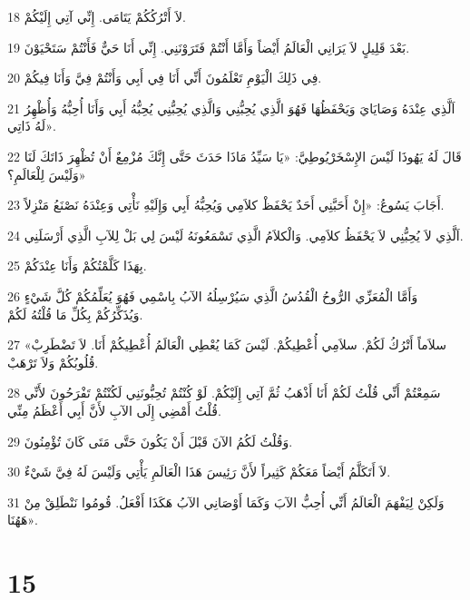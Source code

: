 \par 18 لاَ أَتْرُكُكُمْ يَتَامَى. إِنِّي آتِي إِلَيْكُمْ.
\par 19 بَعْدَ قَلِيلٍ لاَ يَرَانِي الْعَالَمُ أَيْضاً وَأَمَّا أَنْتُمْ فَتَرَوْنَنِي. إِنِّي أَنَا حَيٌّ فَأَنْتُمْ سَتَحْيَوْنَ.
\par 20 فِي ذَلِكَ الْيَوْمِ تَعْلَمُونَ أَنِّي أَنَا فِي أَبِي وَأَنْتُمْ فِيَّ وَأَنَا فِيكُمْ.
\par 21 اَلَّذِي عِنْدَهُ وَصَايَايَ وَيَحْفَظُهَا فَهُوَ الَّذِي يُحِبُّنِي وَالَّذِي يُحِبُّنِي يُحِبُّهُ أَبِي وَأَنَا أُحِبُّهُ وَأُظْهِرُ لَهُ ذَاتِي».
\par 22 قَالَ لَهُ يَهُوذَا لَيْسَ الإِسْخَرْيُوطِيَّ: «يَا سَيِّدُ مَاذَا حَدَثَ حَتَّى إِنَّكَ مُزْمِعٌ أَنْ تُظْهِرَ ذَاتَكَ لَنَا وَلَيْسَ لِلْعَالَمِ؟»
\par 23 أَجَابَ يَسُوعُ: «إِنْ أَحَبَّنِي أَحَدٌ يَحْفَظْ كلاَمِي وَيُحِبُّهُ أَبِي وَإِلَيْهِ نَأْتِي وَعِنْدَهُ نَصْنَعُ مَنْزِلاً.
\par 24 اَلَّذِي لاَ يُحِبُّنِي لاَ يَحْفَظُ كلاَمِي. وَالْكلاَمُ الَّذِي تَسْمَعُونَهُ لَيْسَ لِي بَلْ لِلآبِ الَّذِي أَرْسَلَنِي.
\par 25 بِهَذَا كَلَّمْتُكُمْ وَأَنَا عِنْدَكُمْ.
\par 26 وَأَمَّا الْمُعَزِّي الرُّوحُ الْقُدُسُ الَّذِي سَيُرْسِلُهُ الآبُ بِاسْمِي فَهُوَ يُعَلِّمُكُمْ كُلَّ شَيْءٍ وَيُذَكِّرُكُمْ بِكُلِّ مَا قُلْتُهُ لَكُمْ.
\par 27 «سلاَماً أَتْرُكُ لَكُمْ. سلاَمِي أُعْطِيكُمْ. لَيْسَ كَمَا يُعْطِي الْعَالَمُ أُعْطِيكُمْ أَنَا. لاَ تَضْطَرِبْ قُلُوبُكُمْ وَلاَ تَرْهَبْ.
\par 28 سَمِعْتُمْ أَنِّي قُلْتُ لَكُمْ أَنَا أَذْهَبُ ثُمَّ آتِي إِلَيْكُمْ. لَوْ كُنْتُمْ تُحِبُّونَنِي لَكُنْتُمْ تَفْرَحُونَ لأَنِّي قُلْتُ أَمْضِي إِلَى الآبِ لأَنَّ أَبِي أَعْظَمُ مِنِّي.
\par 29 وَقُلْتُ لَكُمُ الآنَ قَبْلَ أَنْ يَكُونَ حَتَّى مَتَى كَانَ تُؤْمِنُونَ.
\par 30 لاَ أَتَكَلَّمُ أَيْضاً مَعَكُمْ كَثِيراً لأَنَّ رَئِيسَ هَذَا الْعَالَمِ يَأْتِي وَلَيْسَ لَهُ فِيَّ شَيْءٌ.
\par 31 وَلَكِنْ لِيَفْهَمَ الْعَالَمُ أَنِّي أُحِبُّ الآبَ وَكَمَا أَوْصَانِي الآبُ هَكَذَا أَفْعَلُ. قُومُوا نَنْطَلِقْ مِنْ هَهُنَا».

\chapter{15}

